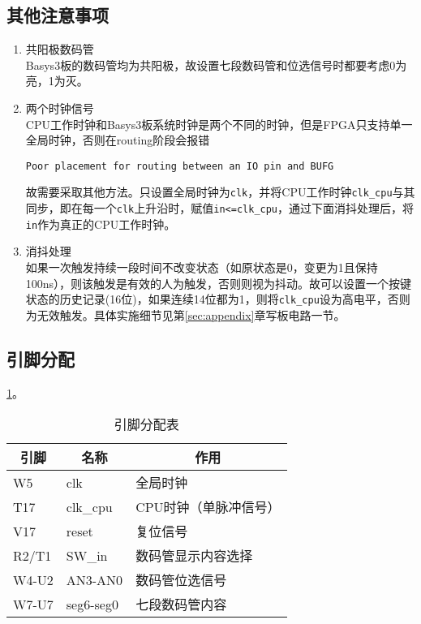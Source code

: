 \subsection{其他注意事项}
\begin{enumerate}
    \item 共阳极数码管\\
    Basys3板的数码管均为共阳极，故设置七段数码管和位选信号时都要考虑0为亮，1为灭。
    \item 两个时钟信号\\%
    CPU工作时钟和Basys3板系统时钟是两个不同的时钟，但是FPGA只支持单一全局时钟，否则在routing阶段会报错
    \begin{center}\verb'Poor placement for routing between an IO pin and BUFG'\end{center}
    故需要采取其他方法。只设置全局时钟为\verb'clk'，并将CPU工作时钟\verb'clk_cpu'与其同步，即在每一个\verb'clk'上升沿时，赋值\verb'in<=clk_cpu'，通过下面消抖处理后，将\verb'in'作为真正的CPU工作时钟。
    \item 消抖处理\\
    如果一次触发持续一段时间不改变状态（如原状态是0，变更为1且保持100ns），则该触发是有效的人为触发，否则则视为抖动。故可以设置一个按键状态的历史记录(16位)，如果连续14位都为1，则将\verb'clk_cpu'设为高电平，否则为无效触发。具体实施细节见第\ref{sec:appendix}章写板电路一节。
\end{enumerate}

\subsection{引脚分配}
\ref{tab:pin}。
\begin{table}[htbp]
  \centering\wuhao
  \caption{引脚分配表}
    \begin{tabular}{|l|l|l|}
    \hline
    \multicolumn{1}{|c|}{引脚} & \multicolumn{1}{c|}{名称} & \multicolumn{1}{c|}{作用} \bigstrut\\
    \hline
    W5    & clk   & 全局时钟 \bigstrut\\
    \hline
    T17   & clk\_cpu & CPU时钟（单脉冲信号） \bigstrut\\
    \hline
    V17   & reset & 复位信号 \bigstrut\\
    \hline
    R2/T1 & SW\_in & 数码管显示内容选择 \bigstrut\\
    \hline
    W4-U2 & AN3-AN0 & 数码管位选信号 \bigstrut\\
    \hline
    W7-U7 & seg6-seg0 & 七段数码管内容 \bigstrut\\
    \hline
    \end{tabular}%
  \label{tab:pin}%
\end{table}%